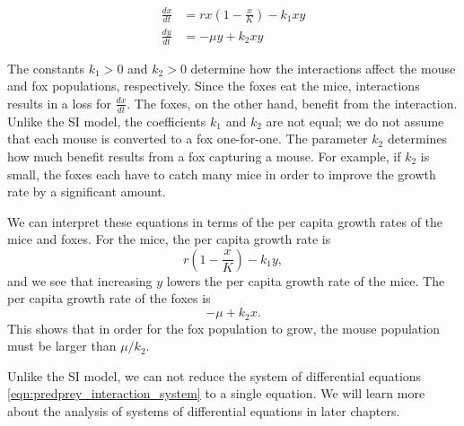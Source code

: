 \begin{equation}
\begin{split}
   \frac{dx}{dt} & = rx\left(1-\frac{x}{K}\right) - k_1xy \\
   \frac{dy}{dt} & = -\mu y + k_2xy
\end{split}
\label{eqn:predprey_interaction_system}
\end{equation}

The constants $k_1 > 0$ and $k_2 > 0$ determine how the
interactions affect the mouse and fox populations, respectively.
Since the foxes eat the mice, interactions results
in a loss for $\frac{dx}{dt}$.
The foxes, on the other hand, benefit from the interaction.
Unlike the SI model, the coefficients $k_1$ and $k_2$
are not equal; we do not assume that
each mouse is converted to a fox one-for-one.
The parameter $k_2$ determines
how much benefit results from a fox capturing a mouse.
For example, if $k_2$ is small, 
the foxes each have to catch many mice in order to improve
the growth rate by a significant amount.

We can interpret these equations in terms of the
per capita growth rates of the mice and foxes.
For the mice, the per capita growth rate
is
\begin{equation}
      r\left(1-\frac{x}{K}\right)-k_1 y,
\end{equation}
and we see that increasing
$y$ lowers the per capita growth rate of the
mice.
The per capita growth rate of the foxes
is
\begin{equation}
-\mu + k_2 x.
\end{equation}
This shows that in order
for the fox population to grow, the mouse 
population must be larger than $\mu/k_2$.

Unlike the SI model, we can not reduce the system
of differential equations
\eqref{eqn:predprey_interaction_system}
to a single equation.
We will learn more about the analysis of systems
of differential equations in later chapters.

%

\newpage

